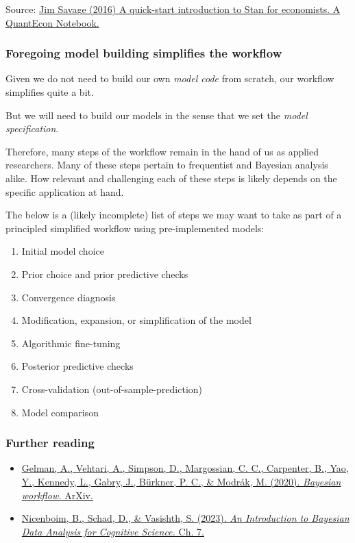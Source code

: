 \documentclass[
  11pt,
]{article}
\providecommand{\tightlist}{%
  \setlength{\itemsep}{0pt}\setlength{\parskip}{0pt}}
\begin{document}
Source: \href{http://nbviewer.jupyter.org/github/QuantEcon/QuantEcon.notebooks/blob/master/IntroToStan_basics_workflow.ipynb}{Jim Savage (2016) A quick-start introduction to Stan for economists. A QuantEcon Notebook.}

\hypertarget{foregoing-model-building-simplifies-the-workflow}{%
\subsubsection{Foregoing model building simplifies the workflow}\label{foregoing-model-building-simplifies-the-workflow}}

Given we do not need to build our own \emph{model code} from scratch, our workflow simplifies quite a bit.

But we will need to build our models in the sense that we set the \emph{model specification}.

Therefore, many steps of the workflow remain in the hand of us as applied researchers. Many of these steps pertain to frequentist and Bayesian analysis alike. How relevant and challenging each of these steps is likely depends on the specific application at hand.

The below is a (likely incomplete) list of steps we may want to take as part of a principled simplified workflow using pre-implemented models:

\begin{enumerate}
\def\labelenumi{\arabic{enumi}.}
\tightlist
\item
  Initial model choice
\item
  Prior choice and prior predictive checks
\item
  Convergence diagnosis
\item
  Modification, expansion, or simplification of the model
\item
  Algorithmic fine-tuning
\item
  Posterior predictive checks
\item
  Cross-validation (out-of-sample-prediction)
\item
  Model comparison
\end{enumerate}

\hypertarget{further-reading}{%
\subsubsection{Further reading}\label{further-reading}}

\begin{itemize}
\tightlist
\item
  \href{https://arxiv.org/abs/2011.01808}{Gelman, A., Vehtari, A., Simpson, D., Margossian, C. C., Carpenter, B., Yao, Y., Kennedy, L., Gabry, J., Bürkner, P. C., \& Modrák, M. (2020). \emph{Bayesian workflow.} ArXiv.}
\item
  \href{https://vasishth.github.io/bayescogsci/book/ch-workflow.html}{Nicenboim, B., Schad, D., \& Vasishth, S. (2023). \emph{An Introduction to Bayesian Data Analysis for Cognitive Science.} Ch. 7.}
\end{itemize}
\end{document}

